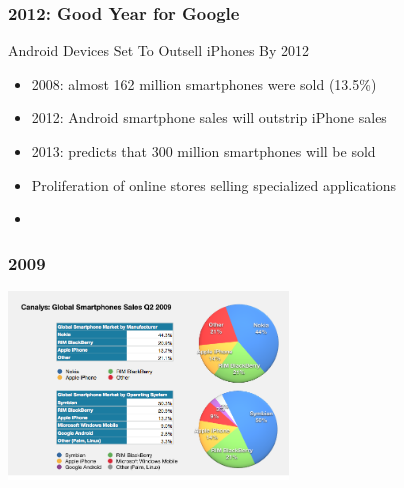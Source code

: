 \documentclass{beamer}
\begin{document}
\begin{frame}
\frametitle{2012: Good Year for Google}

\begin{center}
\begin{large}
 Android Devices Set To Outsell iPhones By 2012
\end{large}
\end{center}

\begin{itemize}
\item 2008: almost 162 million smartphones were sold (13.5\%)
\item 2012: Android smartphone sales will outstrip iPhone sales
\item 2013: predicts that 300 million smartphones will be sold
\item Proliferation of online stores selling specialized applications
\item {}
\end{itemize} 

\end{frame}




\begin{frame}
 \frametitle{2009}

\begin{center}

\hspace{0.2cm}
\includegraphics[height=5.0cm]{figs/global_smartphone_sales}
\hspace{0.2cm}
\end{center}

\end{frame}


\end{document}
